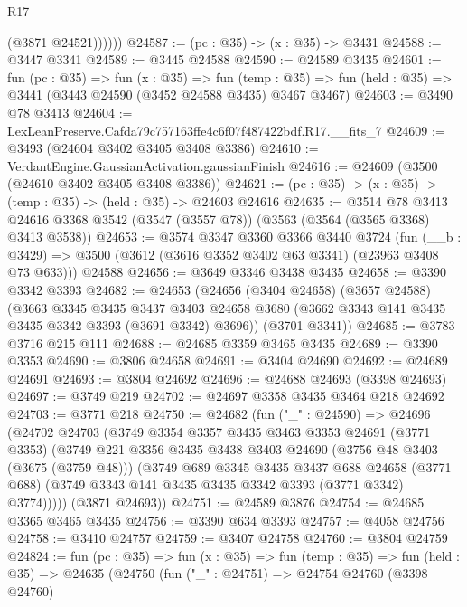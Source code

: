 \begin{lexlean}{R17}
\begin{coremodule}
              (@3871 @24521))))))
@24587 := (pc : @35) -> (x : @35) -> @3431
@24588 := @3447 @3341
@24589 := @3445 @24588
@24590 := @24589 @3435
@24601 := fun (pc : @35) =>
  fun (x : @35) =>
  fun (temp : @35) => fun (held : @35) => @3441 (@3443 @24590 (@3452 @24588 @3435) @3467 @3467)
@24603 := @3490 @78 @3413
@24604 := LexLeanPreserve.Cafda79c757163ffe4c6f07f487422bdf.R17.__fits_7
@24609 := @3493 (@24604 @3402 @3405 @3408 @3386)
@24610 := VerdantEngine.GaussianActivation.gaussianFinish
@24616 := @24609 (@3500 (@24610 @3402 @3405 @3408 @3386))
@24621 := (pc : @35) -> (x : @35) -> (temp : @35) -> (held : @35) -> @24603 @24616
@24635 := @3514
    @78
    @3413
    @24616
    @3368
    @3542
    (@3547 (@3557 @78))
    (@3563 (@3564 (@3565 @3368) @3413 @3538))
@24653 := @3574
    @3347
    @3360
    @3366
    @3440
    @3724
    (fun (__b : @3429) => @3500 (@3612 (@3616 @3352 @3402 @63 @3341) (@23963 @3408 @73 @633)))
    @24588
@24656 := @3649 @3346 @3438 @3435
@24658 := @3390 @3342 @3393
@24682 := @24653
    (@24656
      (@3404 @24658)
      (@3657 @24588)
      (@3663
        @3345
        @3435
        @3437
        @3403
        @24658
        @3680
        (@3662 @3343 @141 @3435 @3435 @3342 @3393 (@3691 @3342) @3696))
      (@3701 @3341))
@24685 := @3783 @3716 @215 @111
@24688 := @24685 @3359 @3465 @3435
@24689 := @3390 @3353
@24690 := @3806 @24658
@24691 := @3404 @24690
@24692 := @24689 @24691
@24693 := @3804 @24692
@24696 := @24688 @24693 (@3398 @24693)
@24697 := @3749 @219
@24702 := @24697 @3358 @3435 @3464 @218 @24692
@24703 := @3771 @218
@24750 := @24682
    (fun ("_" : @24590) =>
    @24696
      (@24702
        @24703
        (@3749
          @3354
          @3357
          @3435
          @3463
          @3353
          @24691
          (@3771 @3353)
          (@3749
            @221
            @3356
            @3435
            @3438
            @3403
            @24690
            (@3756 @48 @3403 (@3675 (@3759 @48)))
            (@3749
              @689
              @3345
              @3435
              @3437
              @688
              @24658
              (@3771 @688)
              (@3749 @3343 @141 @3435 @3435 @3342 @3393 (@3771 @3342) @3774)))))
      (@3871 @24693))
@24751 := @24589 @3876
@24754 := @24685 @3365 @3465 @3435
@24756 := @3390 @634 @3393
@24757 := @4058 @24756
@24758 := @3410 @24757
@24759 := @3407 @24758
@24760 := @3804 @24759
@24824 := fun (pc : @35) =>
  fun (x : @35) =>
  fun (temp : @35) =>
  fun (held : @35) =>
  @24635
    (@24750
      (fun ("_" : @24751) =>
      @24754
        @24760
        (@3398 @24760)

\end{coremodule}
\end{lexlean}
